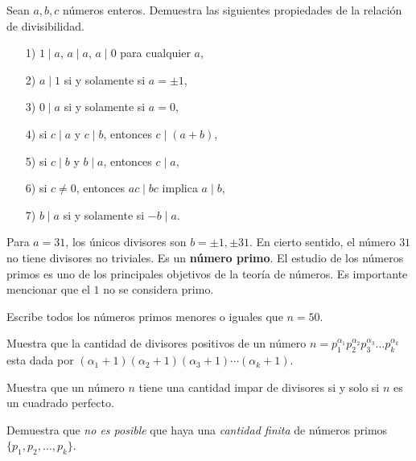 \begin{ejercicio}
  Sean $a,b,c$ números enteros. Demuestra las siguientes propiedades de la relación de divisibilidad.

  \begin{enumerate}
  \item[1)] $1\mid a$, $a \mid a$, $a \mid 0$ para cualquier $a$,

  \item[2)] $a\mid 1$ si y solamente si $a = \pm 1$,

  \item[3)] $0\mid a$ si y solamente si $a = 0$,

  \item[4)] si $c \mid a$ y $c \mid b$, entonces $c \mid (a + b)$,

  \item[5)] si $c \mid b$ y $b \mid a$, entonces $c \mid a$,

  \item[6)] si $c \ne 0$, entonces $ac \mid bc$ implica $a\mid b$,

  \item[7)] $b \mid a$ si y solamente si $-b \mid a$.
  \end{enumerate}
\end{ejercicio}

Para $a = 31$, los únicos divisores son $b = \pm 1, \pm 31$. En cierto
sentido, el número $31$ no tiene divisores no triviales.  Es un {\bf número
primo}. El estudio de los números primos es uno de los principales objetivos de la teoría de números. Es importante mencionar que el $1$ no se considera primo.

\begin{ejercicio}
Escribe todos los números primos menores o iguales que $n=50$.
\end{ejercicio}

\begin{ejercicio}
Muestra que la cantidad de divisores positivos de un número $n=p_1^{\alpha_1}p_2^{\alpha_2}p_3^{\alpha_3}\dots p_k^{\alpha_k}$ esta dada por $(\alpha_1+1)(\alpha_2+1)(\alpha_3+1)\cdots (\alpha_k+1)$.
\end{ejercicio}


\begin{ejercicio}
Muestra que un número $n$ tiene una cantidad impar de divisores si y solo si $n$ es un cuadrado perfecto.
\end{ejercicio}

\begin{ejercicio}
Demuestra que \emph{no es posible} que haya una \emph{cantidad finita} de números primos $\{p_1,p_2,\dots,p_k\}$.
\end{ejercicio}

